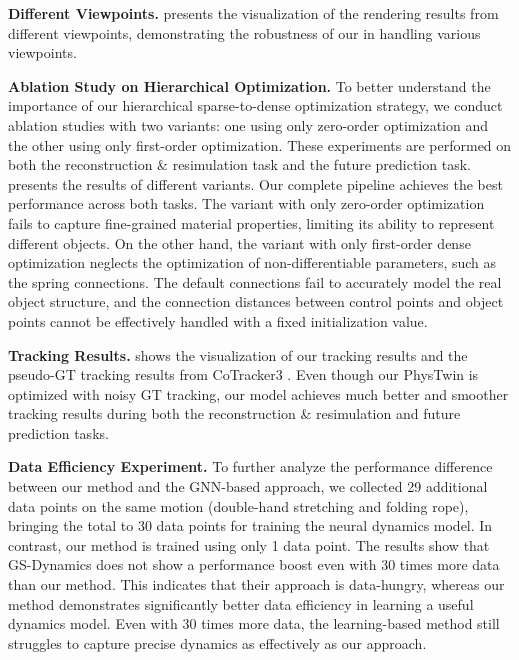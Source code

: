 \documentclass[10pt,twocolumn,letterpaper]{article}
\begin{document}
\textbf{Different Viewpoints.}  presents the visualization of the rendering results from different viewpoints, demonstrating the robustness of our \ourabbr in handling various viewpoints.


\textbf{Ablation Study on Hierarchical Optimization.}
To better understand the importance of our hierarchical sparse-to-dense optimization strategy, we conduct ablation studies with two variants: one using only zero-order optimization and the other using only first-order optimization. These experiments are performed on both the reconstruction \& resimulation task and the future prediction task.  presents the results of different variants.
Our complete pipeline achieves the best performance across both tasks. The variant with only zero-order optimization fails to capture fine-grained material properties, limiting its ability to represent different objects. On the other hand, the variant with only first-order dense optimization neglects the optimization of non-differentiable parameters, such as the spring connections. The default connections fail to accurately model the real object structure, and the connection distances between control points and object points cannot be effectively handled with a fixed initialization value.

\textbf{Tracking Results.}  shows the visualization of our tracking results and the pseudo-GT tracking results from CoTracker3 \cite{karaev2024cotracker3}. Even though our PhysTwin is optimized with noisy GT tracking, our model achieves much better and smoother tracking results during both the reconstruction \& resimulation and future prediction tasks.


\textbf{Data Efficiency Experiment.}  
To further analyze the performance difference between our method and the GNN-based approach, we collected 29 additional data points on the same motion (double-hand stretching and folding rope), bringing the total to 30 data points for training the neural dynamics model. In contrast, our method is trained using only 1 data point. The results show that GS-Dynamics does not show a performance boost even with 30 times more data than our method. This indicates that their approach is data-hungry, whereas our method demonstrates significantly better data efficiency in learning a useful dynamics model. Even with 30 times more data, the learning-based method still struggles to capture precise dynamics as effectively as our approach.
\end{document}

